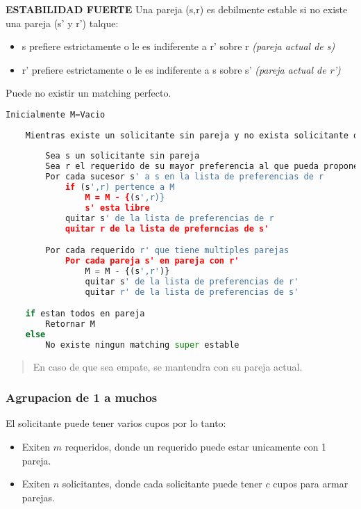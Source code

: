 \documentclass{article}
\begin{document}
\noindent
\textbf{ESTABILIDAD FUERTE}
\newline Una pareja (s,r) es debilmente estable si no existe una pareja (s' y r') talque:
\begin{itemize}
    \item s prefiere estrictamente o le es indiferente a r' sobre r \textit{(pareja actual de s)}
    \item r' prefiere estrictamente o le es indiferente a s sobre s' \textit{(pareja actual de r')}
\end{itemize}
Puede no existir un matching perfecto.

\begin{lstlisting}[language=Python, caption=Algoritmo para parejas super estables]
    Inicialmente M=Vacio
    
    Mientras existe un solicitante sin pareja y no exista solicitante que agoto sus parejas
    
        Sea s un solicitante sin pareja
        Sea r el requerido de su mayor preferencia al que pueda proponer
        Por cada sucesor s' a s en la lista de preferencias de r
            if (s',r) pertence a M
                M = M - {(s',r)}
                s' esta libre
            quitar s' de la lista de preferencias de r
            quitar r de la lista de preferncias de s'

        Por cada requerido r' que tiene multiples parejas
            Por cada pareja s' en pareja con r' 
                M = M - {(s',r')}
                quitar s' de la lista de preferencias de r'
                quitar r' de la lista de preferencias de s'

    if estan todos en pareja
        Retornar M
    else
        No existe ningun matching super estable
\end{lstlisting}    
\begin{quote}
    En caso de que sea empate, se mantendra con su pareja actual.
\end{quote}

\subsubsection{Agrupacion de 1 a muchos}
El solicitante puede tener varios cupos por lo tanto:
\begin{itemize}
    \item Exiten \(m\) requeridos, donde un requerido puede estar unicamente con 1 pareja.
    \item Exiten \(n\) solicitantes, donde cada solicitante puede tener \(c\) cupos para armar parejas.
\end{itemize}
\end{document}
